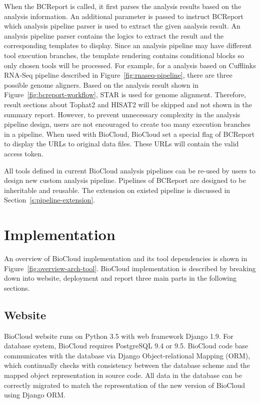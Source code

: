 When the BCReport is called, it first parses the analysis results based on the
analysis information. An additional parameter is passed to instruct BCReport
which analysis pipeline parser is used to extract the given analysis result. An
analysis pipeline parser contains the logics to extract the result and the
corresponding templates to display. Since an analysis pipeline may have
different tool execution branches, the template rendering contains conditional
blocks so only chosen tools will be processed. For example, for a analysis
based on Cufflinks RNA-Seq pipeline described in
Figure~\ref{fig:rnaseq-pipeline}, there are three possible genome aligners.
Based on the analysis result shown in Figure~\ref{fig:bcreport-workflow}, STAR
is used for genome alignment. Therefore, result sections about Tophat2 and
HISAT2 will be skipped and not shown in the summary report. However, to prevent
unnecessary complexity in the analysis pipeline design, users are not
encouraged to create too many execution branches in a pipeline. When used with
BioCloud, BioCloud set a special flag of BCReport to display the URLs to
original data files. These URLs will contain the valid access token.

All tools defined in current BioCloud analysis pipelines can be re-used by
users to design new custom analysis pipeline. Pipelines of BCReport are
designed to be inheritable and reusable. The extension on existed pipeline is
discussed in Section~\ref{s:pipeline-extension}.



\section{Implementation}



An overview of BioCloud implementation and its tool dependencies is shown in
Figure~\ref{fig:overview-arch-tool}. BioCloud implementation is described by
breaking down into website, deployment and report three main parts in the
following sections.


\subsection{Website}

BioCloud website runs on Python 3.5 with web framework Django 1.9. For database
system, BioCloud requires PostgreSQL 9.4 or 9.5. BioCloud code base
communicates with the database via Django Object-relational Mapping (ORM),
which continually checks with consistency between the database scheme and the
mapped object representation in source code. All data in the database can be
correctly migrated to match the representation of the new version of BioCloud
using Django ORM.

